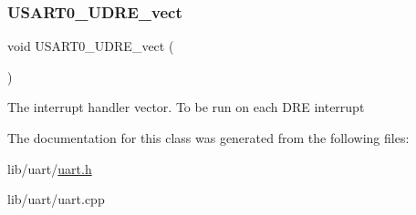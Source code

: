 \subsubsection{\texorpdfstring{U\+S\+A\+R\+T0\+\_\+\+U\+D\+R\+E\+\_\+vect}{USART0\_UDRE\_vect}}
{\footnotesize\ttfamily void U\+S\+A\+R\+T0\+\_\+\+U\+D\+R\+E\+\_\+vect (\begin{DoxyParamCaption}{ }\end{DoxyParamCaption})\hspace{0.3cm}{\ttfamily [friend]}}

The interrupt handler vector. To be run on each D\+RE interrupt 

The documentation for this class was generated from the following files\+:\begin{DoxyCompactItemize}
\item 
lib/uart/\hyperlink{uart_8h}{uart.\+h}\item 
lib/uart/uart.\+cpp\end{DoxyCompactItemize}
